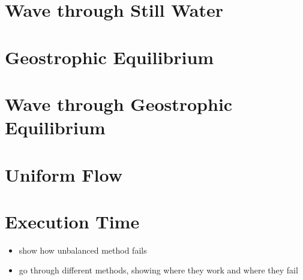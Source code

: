 \section{Wave through Still Water}

\section{Geostrophic Equilibrium}

\section{Wave through Geostrophic Equilibrium}

\section{Uniform Flow}

\section{Execution Time}

\begin{itemize}
  \item show how unbalanced method fails
  \item go through different methods, showing where they work and where they fail
\end{itemize}